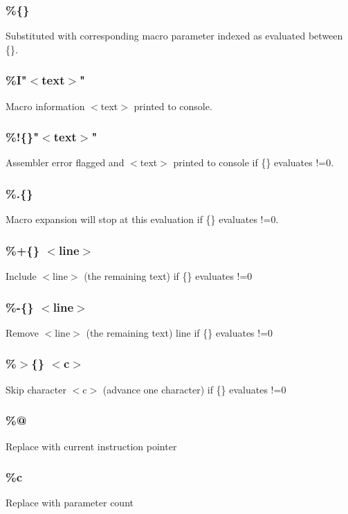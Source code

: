 \documentclass[a4paper,11pt]{article}
\begin{document}
\subsubsection{\%\{\}} 
 Substituted with corresponding macro parameter indexed as evaluated between \{\}.

\subsubsection{\%I"$<$text$>$"} 
 Macro information $<$text$>$ printed to console.

\subsubsection{\%!\{\}"$<$text$>$"} 
 Assembler error flagged and $<$text$>$ printed to console if \{\} evaluates !=0.

\subsubsection{\%.\{\}} 
 Macro expansion will stop at this evaluation if \{\} evaluates !=0.

\subsubsection{\%+\{\} $<$line$>$} 
 Include $<$line$>$ (the remaining text) if \{\} evaluates !=0

\subsubsection{\%-\{\} $<$line$>$} 
 Remove $<$line$>$ (the remaining text) line if \{\} evaluates !=0

\subsubsection{\%$>$\{\} $<$c$>$} 
 Skip character $<$c$>$ (advance one character) if \{\} evaluates !=0

\subsubsection{\%@} 
 Replace with current instruction pointer

\subsubsection{\%c} 
 Replace with parameter count
\end{document}
